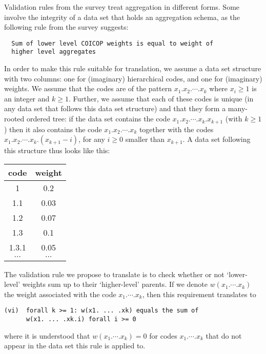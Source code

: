 Validation rules from the survey treat aggregation in different forms. Some involve the integrity of a data set that holds an aggregation schema, as the following rule from the survey suggests:
\begin{verbatim}
  Sum of lower level COICOP weights is equal to weight of
  higher level aggregates
\end{verbatim}
In order to make this rule suitable for translation, we assume a data set structure with two columns: one for (imaginary) hierarchical codes, and one for (imaginary) weights. We assume that the codes are of the pattern $x_1.x_2.\cdots.x_k$ where $x_i\ge 1$ is an integer and $k\ge 1$. Further, we assume that each of these codes is unique (in any data set that follows this data set structure) and that they form a many-rooted ordered tree: if the data set contains the code $x_1.x_2.\cdots.x_k.x_{k+1}$ (with $k\ge 1$) then it also contains the code $x_1.x_2.\cdots.x_k$ together with the codes $x_1.x_2.\cdots.x_k.(x_{k+1}-i)$, for any $i\ge 0$ smaller than $x_{k+1}$. A data set following this structure thus looks like this:
\begin{center}
\begin{tabular}[c]{|c|c|}
\hline
code & weight \\
\hline
\hline
1 & 0.2 \\
\hline
1.1 & 0.03 \\
\hline
1.2 & 0.07 \\
\hline
1.3 & 0.1 \\
\hline
1.3.1 & 0.05 \\
\hline
$\cdots$ & $\cdots$ \\
\hline
\end{tabular}
\end{center}
The validation rule we propose to translate is to check whether or not `lower-level' weights sum up to their `higher-level' parents. If we denote $w(x_1.\cdots.x_k)$ the weight associated with the code $x_1.\cdots.x_k$, then this requirement translates to
\begin{verbatim}
(vi)  forall k >= 1: w(x1. ... .xk) equals the sum of
      w(x1. ... .xk.i) forall i >= 0
\end{verbatim}
where it is understood that $w(x_1.\cdots.x_k)=0$ for codes $x_1.\cdots.x_k$ that do not appear in the data set this rule is applied to.

